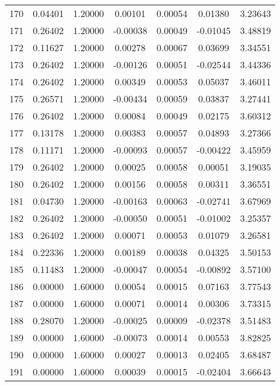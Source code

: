 \begin{longtable}{c c c c c c c}
170 &  0.04401 &      1.20000 &  0.00101 &   0.00054 &   0.01380 &   3.23643 \\
171 &  0.26402 &      1.20000 & -0.00038 &   0.00049 &  -0.01045 &   3.48819 \\
172 &  0.11627 &      1.20000 &  0.00278 &   0.00067 &   0.03699 &   3.34551 \\
173 &  0.26402 &      1.20000 & -0.00126 &   0.00051 &  -0.02544 &   3.44336 \\
174 &  0.26402 &      1.20000 &  0.00349 &   0.00053 &   0.05037 &   3.46011 \\
175 &  0.26571 &      1.20000 & -0.00434 &   0.00059 &   0.03837 &   3.27441 \\
176 &  0.26402 &      1.20000 &  0.00084 &   0.00049 &   0.02175 &   3.60312 \\
177 &  0.13178 &      1.20000 &  0.00383 &   0.00057 &   0.04893 &   3.27366 \\
178 &  0.11171 &      1.20000 & -0.00093 &   0.00057 &  -0.00422 &   3.45959 \\
179 &  0.26402 &      1.20000 &  0.00025 &   0.00058 &   0.00051 &   3.19035 \\
180 &  0.26402 &      1.20000 &  0.00156 &   0.00058 &   0.00311 &   3.36551 \\
181 &  0.04730 &      1.20000 & -0.00163 &   0.00063 &  -0.02741 &   3.67969 \\
182 &  0.26402 &      1.20000 & -0.00050 &   0.00051 &  -0.01002 &   3.25357 \\
183 &  0.26402 &      1.20000 &  0.00071 &   0.00053 &   0.01079 &   3.26581 \\
184 &  0.22336 &      1.20000 &  0.00189 &   0.00038 &   0.04325 &   3.50153 \\
185 &  0.11483 &      1.20000 & -0.00047 &   0.00054 &  -0.00892 &   3.57100 \\
186 &  0.00000 &      1.60000 &  0.00054 &   0.00015 &   0.07163 &   3.77543 \\
187 &  0.00000 &      1.60000 &  0.00071 &   0.00014 &   0.00306 &   3.73315 \\
188 &  0.28070 &      1.20000 & -0.00025 &   0.00009 &  -0.02378 &   3.51483 \\
189 &  0.00000 &      1.60000 & -0.00073 &   0.00014 &   0.00553 &   3.82825 \\
190 &  0.00000 &      1.60000 &  0.00027 &   0.00013 &   0.02405 &   3.68487 \\
191 &  0.00000 &      1.60000 &  0.00039 &   0.00015 &  -0.02404 &   3.66643 \\

\end{longtable}
